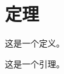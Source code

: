 %
%
%
%
%
%
%
%
%

\section{定理}


\begin{Definition}
	这是一个定义。
\end{Definition}

\begin{Theorem}
	这是一个引理。
\end{Theorem}

